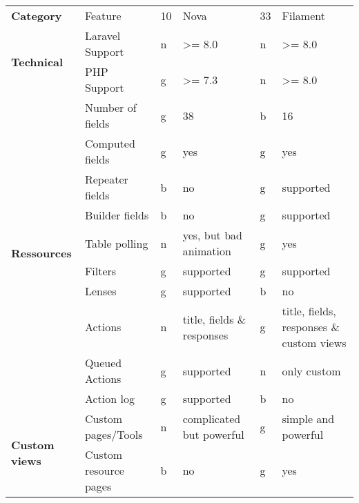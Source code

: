 \begin{table}[]
    \begin{tabular}{llllll}
        \textbf{Category}                        & Feature                & 10 & Nova                            & 33 & Filament                                 \\
        \multirow{2}{*}{\textbf{Technical}}      & Laravel Support        & n  & \textgreater{}= 8.0             & n  & \textgreater{}= 8.0                      \\
        & PHP Support            & g  & \textgreater{}= 7.3             & n  & \textgreater{}= 8.0                      \\
        \multirow{10}{*}{\textbf{Ressources}}    & Number of fields       & g  & 38                              & b  & 16                                       \\
        & Computed fields        & g  & yes                             & g  & yes                                      \\
        & Repeater fields        & b  & no                              & g  & supported                                \\
        & Builder fields         & b  & no                              & g  & supported                                \\
        & Table polling          & n  & yes, but bad animation          & g  & yes                                      \\
        & Filters                & g  & supported                       & g  & supported                                \\
        & Lenses                 & g  & supported                       & b  & no                                       \\
        & Actions                & n  & title, fields \& responses      & g  & title, fields, responses \& custom views \\
        & Queued Actions         & g  & supported                       & n  & only custom                              \\
        & Action log             & g  & supported                       & b  & no                                       \\
        \multirow{3}{*}{\textbf{Custom views}}   & Custom pages/Tools     & n  & complicated but powerful        & g  & simple and powerful                      \\
        & Custom resource pages  & b  & no                              & g  & yes                                      \\

\end{tabular}
\end{table}
